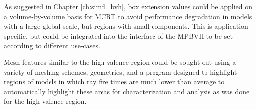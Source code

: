 As suggested in Chapter \ref{ch:simd_bvh}, box extension values could be applied
on a volume-by-volume basis for MCRT to avoid performance degradation in models
with a large global scale, but regions with small components. This is
application-specific, but could be integrated into the interface of the MPBVH
to be set according to different use-cases.

Mesh features similar to the high valence region could be sought out using a
variety of meshing schemes, geometries, and a program designed to highlight
regions of models in which ray fire times are much lower than average to
automatically highlight these areas for characterization and analysis as was
done for the high valence region. 


